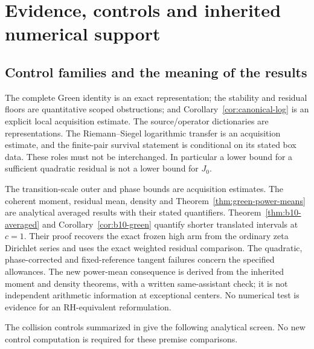 \section{Evidence, controls and inherited numerical support}\label{sec:evidence}

\subsection{Control families and the meaning of the results}

The complete Green identity is an exact representation; the stability
and residual floors are quantitative scoped obstructions; and
Corollary~\ref{cor:canonical-log} is an explicit local acquisition
estimate. The source/operator dictionaries are representations. The
Riemann--Siegel logarithmic transfer is an acquisition estimate, and the
finite-pair survival statement is conditional on its stated box data. These roles must not be interchanged. In particular a
lower bound for a sufficient quadratic residual is not a lower
bound for \(J_0\).

The transition-scale outer and phase bounds are acquisition estimates.
The coherent moment, residual mean, density and
Theorem~\ref{thm:green-power-means} are analytical averaged results
with their stated quantifiers. Theorem~\ref{thm:b10-averaged} and
Corollary~\ref{cor:b10-green} quantify shorter translated intervals
at \(c=1\). Their proof recovers the exact frozen high arm from the
ordinary zeta Dirichlet series and uses the exact weighted residual
comparison.
The quadratic, phase-corrected and
fixed-reference tangent failures concern the specified allowances.
The new power-mean consequence is derived from the inherited moment
and density theorems, with a written same-assistant check; it is not
independent arithmetic information at exceptional centers. No numerical
test is evidence for an RH-equivalent reformulation.

The collision controls summarized in \cite{OGControls} give the
following analytical screen. No new control computation is required
for these premise comparisons.

